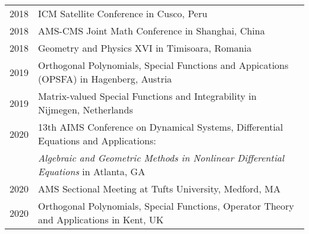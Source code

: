 \documentclass[12pt,letterpaper]{article}
\theoremstyle{definition}
\begin{document}
\begin{tabular}{ll}
2018 & ICM Satellite Conference in Cusco, Peru\\
2018 & AMS-CMS Joint Math Conference in Shanghai, China\\
2018 & Geometry and Physics XVI in Timisoara, Romania\\
2019 & Orthogonal Polynomials, Special Functions and Appications (OPSFA) in Hagenberg, Austria\\
2019 & Matrix-valued Special Functions and Integrability in Nijmegen, Netherlands\\
2020 & 13th AIMS Conference on Dynamical Systems, Differential Equations and Applications:\\
     & \textit{Algebraic and Geometric Methods in Nonlinear Differential Equations} in Atlanta, GA\\
2020 & AMS Sectional Meeting at Tufts University, Medford, MA\\
2020 & Orthogonal Polynomials, Special Functions, Operator Theory and Applications in Kent, UK
\end{tabular}
\end{document}
